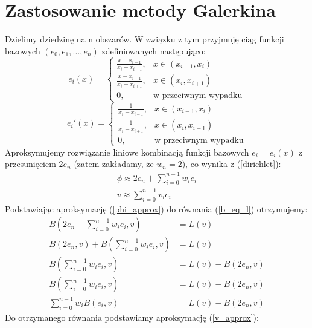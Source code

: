 \documentclass[a4paper,12pt]{article}
\begin{document}
    \section{Zastosowanie metody Galerkina}
    Dzielimy dziedzinę na n obszarów.
    W związku z tym przyjmuję ciąg funkcji bazowych \((e_0, e_1, ..., e_n)\) zdefiniowanych następująco:
    \begin{equation}
        e_i(x) =
        \begin{cases}
            \frac{x-x_{i-1}}{x_i-x_{i-1}},& x \in (x_{i-1}, x_i) \\
            \frac{x-x_{i+1}}{x_i-x_{i+1}},& x \in (x_i, x_{i+1}) \\
            0,& \text{w przeciwnym wypadku}
        \end{cases} \label{e_def}
    \end{equation}
    \begin{equation}
        e_i'(x) =
        \begin{cases}
            \frac{1}{x_i-x_{i-1}},& x \in (x_{i-1}, x_i) \\
            \frac{1}{x_i-x_{i+1}},& x \in (x_i, x_{i+1}) \\
            0,& \text{w przeciwnym wypadku}
        \end{cases} \label{eprime_def}
    \end{equation}
    Aproksymujemy rozwiązanie liniowe kombinacją funkcji bazowych \(e_i = e_i(x)\) z przesunięciem \(2e_n\) (zatem zakładamy, że \(w_n = 2\)), co wynika z (\ref{dirichlet}):
    \begin{gather}
        \phi \approx 2e_n + \sum_{i=0}^{n-1} w_i e_i \label{phi_approx}\\
        v \approx \sum_{i=0}^{n-1} v_i e_i \label{v_approx}
    \end{gather}
    Podstawiając aproksymację (\ref{phi_approx}) do równania (\ref{b_eq_l}) otrzymujemy:
    \begin{align*}
        B\left(2e_n + \sum_{i=0}^{n-1} w_i e_i, v\right) &= L(v) \\
        B(2e_n, v) + B\left(\sum_{i=0}^{n-1} w_i e_i, v\right) &= L(v) \\
        B\left(\sum_{i=0}^{n-1} w_i e_i, v\right) &= L(v)-B(2e_n, v) \\
        B\left(\sum_{i=0}^{n-1} w_i e_i, v\right) &= L(v)-B(2e_n, v) \\
        \sum_{i=0}^{n-1} w_i B(e_i, v) &= L(v)-B(2e_n, v)
    \end{align*}
    Do otrzymanego równania podstawiamy aproksymację (\ref{v_approx}):
\end{document}
